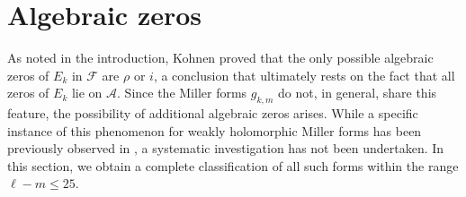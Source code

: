 \documentclass[12pt]{amsart}
\theoremstyle{plain} %
\theoremstyle{definition}
\theoremstyle{remark}
\numberwithin{equation}{section}
\begin{document}
\section{Algebraic zeros} \label{Algebraic-zeros}

As noted in the introduction, Kohnen \cite{kohnen:eisenstein} proved that the only possible algebraic zeros of $E_k$ in $\mathcal{F}$ are $\rho$ or $i$, a conclusion that ultimately rests on the fact that all zeros of $E_k$ lie on $\mathcal{A}$. Since the Miller forms $g_{k,m}$ do not, in general, share this feature, the possibility of additional algebraic zeros arises. While a specific instance of this phenomenon for weakly holomorphic  Miller forms has been previously observed in \cite{swisher}, a systematic investigation has not been undertaken. In this section, we obtain a complete classification of all such forms within the range $\ell-m\le 25$. 
\end{document}
